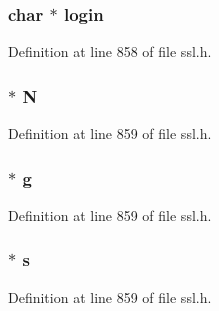 \subsubsection[{\texorpdfstring{login}{login}}]{\setlength{\rightskip}{0pt plus 5cm}char $\ast$ login}\hypertarget{structsrp__ctx__st_a6bdc87ebf8486777210fb586a76dd71a}{}\label{structsrp__ctx__st_a6bdc87ebf8486777210fb586a76dd71a}


Definition at line 858 of file ssl.\+h.

\subsubsection[{\texorpdfstring{N}{N}}]{ $\ast$ N}\hypertarget{structsrp__ctx__st_aea6e731e3cc1aef110a1dbd1545eeff0}{}\label{structsrp__ctx__st_aea6e731e3cc1aef110a1dbd1545eeff0}


Definition at line 859 of file ssl.\+h.

\subsubsection[{\texorpdfstring{g}{g}}]{ $\ast$ g}\hypertarget{structsrp__ctx__st_a13fc89a0daf188f7de9a2011bc9b051f}{}\label{structsrp__ctx__st_a13fc89a0daf188f7de9a2011bc9b051f}


Definition at line 859 of file ssl.\+h.

\subsubsection[{\texorpdfstring{s}{s}}]{ $\ast$ s}\hypertarget{structsrp__ctx__st_a174fa2d60f08e563a4405911f6c81172}{}\label{structsrp__ctx__st_a174fa2d60f08e563a4405911f6c81172}


Definition at line 859 of file ssl.\+h.


